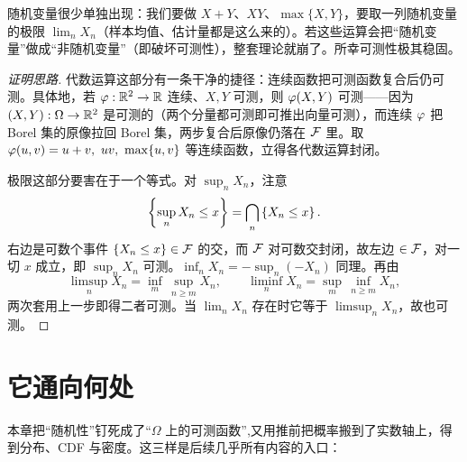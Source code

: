 随机变量很少单独出现：我们要做 $X+Y$、$XY$、$\max\{X,Y\}$，要取一列随机变量的极限 $\lim_n X_n$（样本均值、估计量都是这么来的）。若这些运算会把``随机变量''做成``非随机变量''（即破坏可测性），整套理论就崩了。所幸可测性极其稳固。

\begin{proof}[证明思路]
代数运算这部分有一条干净的捷径：连续函数把可测函数复合后仍可测。具体地，若 $\varphi:\mathbb{R}^2\to\mathbb{R}$ 连续、$X,Y$ 可测，则 $\varphi(X,Y)$ 可测——因为 $(X,Y):\Omega\to\mathbb{R}^2$ 是可测的（两个分量都可测即可推出向量可测），而连续 $\varphi$ 把 Borel 集的原像拉回 Borel 集，两步复合后原像仍落在 $\mathcal{F}$ 里。取 $\varphi(u,v)=u+v,\ uv,\ \max\{u,v\}$ 等连续函数，立得各代数运算封闭。

极限这部分要害在于一个等式。对 $\sup_n X_n$，注意
\[
    \left\{\sup_n X_n\le x\right\}=\bigcap_{n}\left\{X_n\le x\right\}.
\]
右边是可数个事件 $\{X_n\le x\}\in\mathcal{F}$ 的交，而 $\mathcal{F}$ 对可数交封闭，故左边 $\in\mathcal{F}$，对一切 $x$ 成立，即 $\sup_n X_n$ 可测。$\inf_n X_n=-\sup_n(-X_n)$ 同理。再由
\[
    \limsup_n X_n=\inf_{m}\,\sup_{n\ge m}X_n,\qquad \liminf_n X_n=\sup_{m}\,\inf_{n\ge m}X_n,
\]
两次套用上一步即得二者可测。当 $\lim_n X_n$ 存在时它等于 $\limsup_n X_n$，故也可测。
\end{proof}


\section{它通向何处}
\label{sec:randomvar-8}

本章把``随机性''钉死成了``$\Omega$ 上的可测函数'',又用推前把概率搬到了实数轴上，得到分布、CDF 与密度。这三样是后续几乎所有内容的入口：


